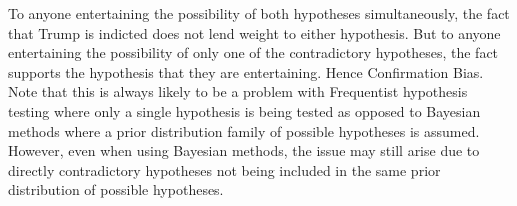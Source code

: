 \documentclass[../MathsNotesBase.tex]{subfiles}
\begin{document}
	To anyone entertaining the possibility of both hypotheses simultaneously, the fact that Trump is indicted does not lend weight to either hypothesis. But to anyone entertaining the possibility of only one of the contradictory hypotheses, the fact supports the hypothesis that they are entertaining. Hence Confirmation Bias.\\
	
	Note that this is always likely to be a problem with Frequentist hypothesis testing where only a single hypothesis is being tested as opposed to Bayesian methods where a prior distribution family of possible hypotheses is assumed. However, even when using Bayesian methods, the issue may still arise due to directly contradictory hypotheses not being included in the same prior distribution of possible hypotheses.
\end{document}
